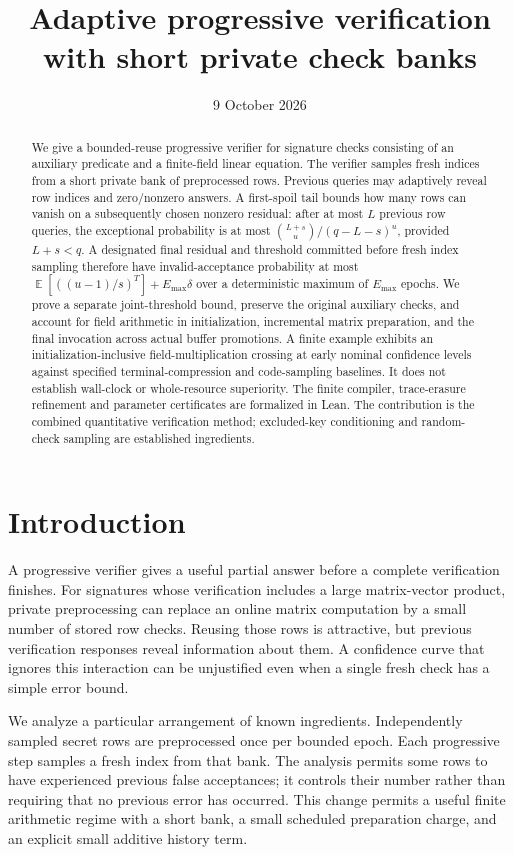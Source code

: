 \documentclass[11pt,letterpaper]{article}
\title{Adaptive progressive verification with short private check banks}
\author{}
\date{9 October 2026}
\theoremstyle{definition}
\newcommand{\Ex}{\mathop{\mathbb E}}
\newcommand{\Emax}{E_{\max}}
\begin{document}
\maketitle
\vspace{-1.7em}
\begin{abstract}
We give a bounded-reuse progressive verifier for signature checks consisting of an auxiliary predicate and a finite-field linear equation. The verifier samples fresh indices from a short private bank of preprocessed rows. Previous queries may adaptively reveal row indices and zero/nonzero answers. A first-spoil tail bounds how many rows can vanish on a subsequently chosen nonzero residual: after at most $L$ previous row queries, the exceptional probability is at most $\binom{L+s}{u}/(q-L-s)^u$, provided $L+s<q$. A designated final residual and threshold committed before fresh index sampling therefore have invalid-acceptance probability at most $\Ex[((u-1)/s)^T]+\Emax\delta$ over a deterministic maximum of $\Emax$ epochs. We prove a separate joint-threshold bound, preserve the original auxiliary checks, and account for field arithmetic in initialization, incremental matrix preparation, and the final invocation across actual buffer promotions. A finite example exhibits an initialization-inclusive field-multiplication crossing at early nominal confidence levels against specified terminal-compression and code-sampling baselines. It does not establish wall-clock or whole-resource superiority. The finite compiler, trace-erasure refinement and parameter certificates are formalized in Lean. The contribution is the combined quantitative verification method; excluded-key conditioning and random-check sampling are established ingredients.
\end{abstract}

\section{Introduction}
A progressive verifier gives a useful partial answer before a complete verification finishes. For signatures whose verification includes a large matrix-vector product, private preprocessing can replace an online matrix computation by a small number of stored row checks. Reusing those rows is attractive, but previous verification responses reveal information about them. A confidence curve that ignores this interaction can be unjustified even when a single fresh check has a simple error bound.

We analyze a particular arrangement of known ingredients. Independently sampled secret rows are preprocessed once per bounded epoch. Each progressive step samples a fresh index from that bank. The analysis permits some rows to have experienced previous false acceptances; it controls their number rather than requiring that no previous error has occurred. This change permits a useful finite arithmetic regime with a short bank, a small scheduled preparation charge, and an explicit small additive history term.
\end{document}
